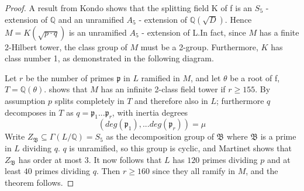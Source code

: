\documentclass[12pt]{extarticle}
\newcommand{\Q}{\mathbb{Q}}
\newcommand{\<}{\langle}
\renewcommand{\>}{\rangle}
\theoremstyle{definition}
\begin{document}
\begin{proof}
A result from Kondo \cite{KOND} shows that the splitting field K
of f is an $S_5$ - extension of $\Q$ and an unramified $A_5$ - extension of $\Q(\sqrt{D})$. Hence $M=K\left(\sqrt{p \cdot q}\right)$ is an
unramified $A_5$ - extension of L.In fact, since $M$ has a finite 2-Hilbert tower, the class group of $M$ must be a 2-group.  Furthermore, $K$ has class number 1, as demonstrated in the following diagram.
\begin{center}
\end{center}

Let $r$ be the number of primes $\mathfrak{p}$ in $L$ ramified in $M$, and let $\theta$ be a root of f, $T = \Q(\theta)$. \cite{MART1978} shows that $M$ has an infinite 2-class field tower if $r\geq 155$. By assumption $p$ splits completely in $T$ and therefore also in $L$; furthermore $q$ decomposes in $T$ as $q = \mathfrak{p}_1...\mathfrak{p}_r$, with inertia degrees
\begin{equation}
    (deg(\mathfrak{p}_1),...deg(\mathfrak{p}_r))=\mu 
\end{equation}
Write $Z_\mathfrak{B}\subseteq\Gamma(L/\Q) = S_5$ as the decomposition group of $\mathfrak{B}$ where $\mathfrak{B}$ is a prime in $L$ dividing $q$. $q$ is unramified, so this group is cyclic, and Martinet \cite{MART1978} shows that $Z_\mathfrak{B}$ has order at most $3$.  It now follows that $L$ has $120$ primes dividing $p$ and at least $40$ primes dividing $q$. Then $r\geq 160$ since they all ramify in $M$, and the theorem follows.
\end{proof}
\end{document}
